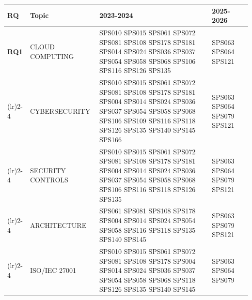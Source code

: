 \begin{table}[htbp]
	\centering
	\setlength{\tabcolsep}{2pt}
	\begin{tabularx}{\textwidth}{p{0.8cm}p{2.5cm}>{\raggedright\arraybackslash}X>{\raggedright\arraybackslash}X}
		\toprule
		\textbf{RQ}                          & \textbf{Topic}          & \textbf{2023-2024}                         	& \textbf{2025-2026}             								\\
		\midrule
		\multirow{0}{*}[0em]{\textbf{RQ1}}  & CLOUD COMPUTING 		   & SPS010 SPS015 SPS061 SPS072 SPS081 SPS108 
																		 SPS178 SPS181 SPS014 SPS024 SPS036 SPS037 
																		 SPS054 SPS058 SPS068 SPS106 SPS116 SPS126 
																		 SPS135                     					& SPS063 SPS064 SPS121                							\\
		\addlinespace[0.3em]
		\cmidrule(lr){2-4}
		                                     & CYBERSECURITY           & SPS010 SPS015 SPS061 SPS072 SPS081 SPS108 	
																		 SPS178 SPS181 SPS004 SPS014 SPS024 SPS036 
																		 SPS037 SPS054 SPS058 SPS068 SPS106 SPS109 
																		 SPS116 SPS118 SPS126 SPS135 SPS140 SPS145 
																		 SPS166 										& SPS063 SPS064 SPS079 SPS121                          			\\
		\addlinespace[0.3em]
		\cmidrule(lr){2-4}
		                                     & SECURITY CONTROLS       & SPS010 SPS015 SPS061 SPS072 SPS081 SPS108 
																		 SPS178 SPS181 SPS004 SPS014 SPS024 SPS036 
																		 SPS037 SPS054 SPS058 SPS068 SPS106 SPS116 
																		 SPS118 SPS126 SPS135                     	& SPS063 SPS064 SPS079 SPS121       							 \\
		\addlinespace[0.3em]
		\cmidrule(lr){2-4}
		                                     & ARCHITECTURE            & SPS061 SPS081 SPS108 SPS178 SPS004 SPS014 
																		 SPS024 SPS054 SPS058 SPS116 SPS118 SPS135 
																		 SPS140 SPS145 								& SPS063 SPS079 SPS121                             				 \\
		\addlinespace[0.3em]
		\cmidrule(lr){2-4}
		                                     & ISO/IEC 27001           & SPS010 SPS015 SPS061 SPS072 SPS081 SPS108 
																		 SPS178 SPS004 SPS014 SPS024 SPS036 SPS037 
																		 SPS054 SPS058 SPS068 SPS118 SPS126 SPS135 
																		 SPS140 SPS145               					& SPS063 SPS064 SPS079											 \\

\end{tabularx}
\end{table}

